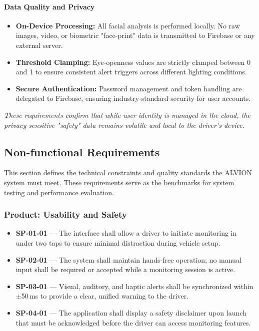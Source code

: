 \documentclass[11pt]{report}
\begin{document}
\paragraph{Data Quality and Privacy}
\begin{itemize}
    \item \textbf{On-Device Processing:} All facial analysis is performed locally. No raw images, video, or biometric "face-print" data is transmitted to Firebase or any external server.
    \item \textbf{Threshold Clamping:} Eye-openness values are strictly clamped between 0 and 1 to ensure consistent alert triggers across different lighting conditions.
    \item \textbf{Secure Authentication:} Password management and token handling are delegated to Firebase, ensuring industry-standard security for user accounts.
\end{itemize}

\textit{These requirements confirm that while user identity is managed in the cloud, the privacy-sensitive "safety" data remains volatile and local to the driver's device.}

\subsection{Non-functional Requirements}
This section defines the technical constraints and quality standards the ALVION system must meet. These requirements serve as the benchmarks for system testing and performance evaluation.

\subsubsection{Product: Usability and Safety}
\begin{itemize}
    \item \textbf{SP-01-01} — The interface shall allow a driver to initiate monitoring in under two taps to ensure minimal distraction during vehicle setup.
    \item \textbf{SP-02-01} — The system shall maintain hands-free operation; no manual input shall be required or accepted while a monitoring session is active.
    \item \textbf{SP-03-01} — Visual, auditory, and haptic alerts shall be synchronized within $\pm$50\,ms to provide a clear, unified warning to the driver.
    \item \textbf{SP-04-01} — The application shall display a safety disclaimer upon launch that must be acknowledged before the driver can access monitoring features.
\end{itemize}
\end{document}
